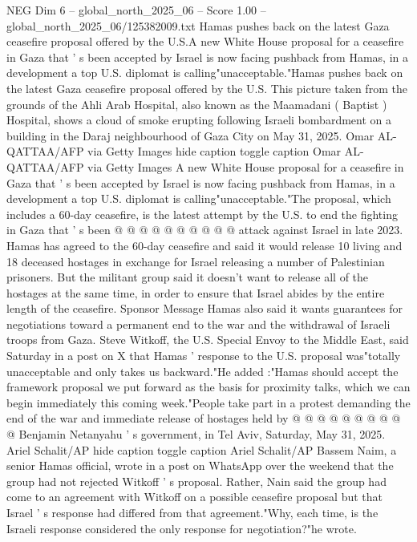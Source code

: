 \begin{textsample}{NEG Dim 6 – global\_north\_2025\_06 – Score 1.00 – global\_north\_2025\_06/125382009.txt}  \label{ex:f6_neg_416}
Hamas pushes back on the latest Gaza ceasefire proposal offered by the U.S.A new White House proposal for a ceasefire in Gaza that ' s been accepted by Israel is now facing pushback from Hamas, in a development a top U.S. diplomat is calling"unacceptable."Hamas pushes back on the latest Gaza ceasefire proposal offered by the U.S.
This picture taken from the grounds of the Ahli Arab Hospital, also known as the Maamadani ( Baptist ) Hospital, shows a cloud of smoke erupting following Israeli bombardment on a building in the Daraj neighbourhood of Gaza City on May 31, 2025.
Omar AL-QATTAA/AFP via Getty Images hide caption toggle caption Omar AL-QATTAA/AFP via Getty Images A new White House proposal for a ceasefire in Gaza that ' s been accepted by Israel is now facing pushback from Hamas, in a development a top U.S. diplomat is calling"unacceptable."The proposal, which includes a 60-day ceasefire, is the latest attempt by the U.S. to end the fighting in Gaza that ' s been @ @ @ @ @ @ @ @ @ @ attack against Israel in late 2023.
Hamas has agreed to the 60-day ceasefire and said it would release 10 living and 18 deceased hostages in exchange for Israel releasing a number of Palestinian prisoners.
But the militant group said it doesn't want to release all of the hostages at the same time, in order to ensure that Israel abides by the entire length of the ceasefire.
Sponsor Message Hamas also said it wants guarantees for negotiations toward a permanent end to the war and the withdrawal of Israeli troops from Gaza.
Steve Witkoff, the U.S.
Special Envoy to the Middle East, said Saturday in a post on X that Hamas ' response to the U.S. proposal was"totally unacceptable and only takes us backward."He added :"Hamas should accept the framework proposal we put forward as the basis for proximity talks, which we can begin immediately this coming week."People take part in a protest demanding the end of the war and immediate release of hostages held by @ @ @ @ @ @ @ @ @ @ Benjamin Netanyahu ' s government, in Tel Aviv, Saturday, May 31, 2025.
Ariel Schalit/AP hide caption toggle caption Ariel Schalit/AP Bassem Naim, a senior Hamas official, wrote in a post on WhatsApp over the weekend that the group had not rejected Witkoff ' s proposal.
Rather, Nain said the group had come to an agreement with Witkoff on a possible ceasefire proposal but that Israel ' s response had differed from that agreement."Why, each time, is the Israeli response considered the only response for negotiation?"he wrote.

\end{textsample}
